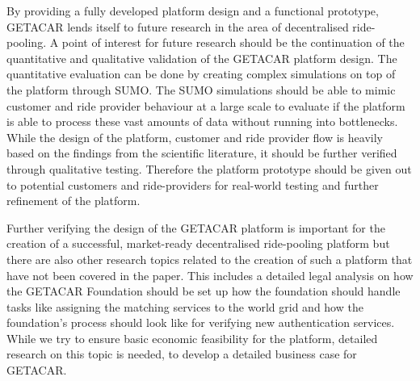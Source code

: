 By providing a fully developed platform design and a functional prototype, GETACAR lends itself to future research in the area of decentralised ride-pooling.
A point of interest for future research should be the continuation of the quantitative and qualitative validation of the GETACAR platform design. The quantitative evaluation can be done by creating complex simulations on top of the platform through SUMO. The SUMO simulations should be able to mimic customer and ride provider behaviour at a large scale to evaluate if the platform is able to process these vast amounts of data without running into bottlenecks. While the design of the platform, customer and ride provider flow is heavily based on the findings from the scientific literature, it should be further verified through qualitative testing. Therefore the platform prototype should be given out to potential customers and ride-providers for real-world testing and further refinement of the platform.

Further verifying the design of the GETACAR platform is important for the creation of a successful, market-ready decentralised ride-pooling platform but there are also other research topics related to the creation of such a platform that have not been covered in the paper. This includes a detailed legal analysis on how the GETACAR Foundation should be set up how the foundation should handle tasks like assigning the matching services to the world grid and how the foundation's process should look like for verifying new authentication services.
While we try to ensure basic economic feasibility for the platform, detailed research on this topic is needed, to develop a detailed business case for GETACAR.